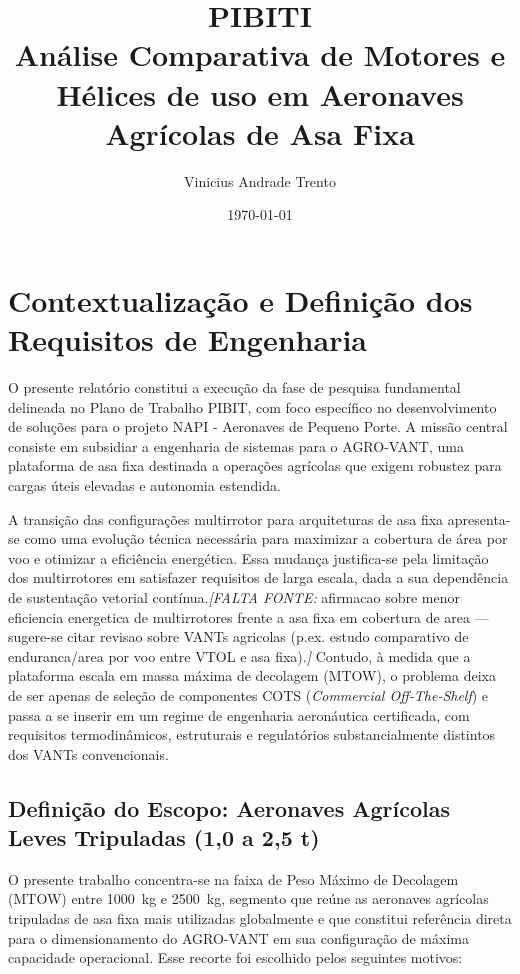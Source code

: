 \documentclass[a4paper,12pt]{article}
\title{\textbf{PIBITI}\\[0.3em]Análise Comparativa de Motores e Hélices de uso em Aeronaves Agrícolas de Asa Fixa}
\author{Vinicius Andrade Trento}
\date{\today}
\newcommand{\citesugerida}[1]{{\color{red}\textit{[FALTA FONTE: }#1\textit{]}}}
\begin{document}
\maketitle
\newpage
\tableofcontents
\newpage


\section{Contextualização e Definição dos Requisitos de Engenharia}

O presente relatório constitui a execução da fase de pesquisa fundamental delineada no Plano de Trabalho PIBIT, com foco específico no desenvolvimento de soluções para o projeto NAPI - Aeronaves de Pequeno Porte. A missão central consiste em subsidiar a engenharia de sistemas para o AGRO-VANT, uma plataforma de asa fixa destinada a operações agrícolas que exigem robustez para cargas úteis elevadas e autonomia estendida.

A transição das configurações multirrotor para arquiteturas de asa fixa apresenta-se como uma evolução técnica necessária para maximizar a cobertura de área por voo e otimizar a eficiência energética. Essa mudança justifica-se pela limitação dos multirrotores em satisfazer requisitos de larga escala, dada a sua dependência de sustentação vetorial contínua.\citesugerida{afirmacao sobre menor eficiencia energetica de multirrotores frente a asa fixa em cobertura de area --- sugere-se citar revisao sobre VANTs agricolas (p.ex. estudo comparativo de enduranca/area por voo entre VTOL e asa fixa).} Contudo, à medida que a plataforma escala em massa máxima de decolagem (MTOW), o problema deixa de ser apenas de seleção de componentes COTS (\textit{Commercial Off-The-Shelf}) e passa a se inserir em um regime de engenharia aeronáutica certificada, com requisitos termodinâmicos, estruturais e regulatórios substancialmente distintos dos VANTs convencionais.

\subsection{Definição do Escopo: Aeronaves Agrícolas Leves Tripuladas (1{,}0 a 2{,}5 t)}

O presente trabalho concentra-se na faixa de Peso Máximo de Decolagem (MTOW) entre \SI{1000}{kg} e \SI{2500}{kg}, segmento que reúne as aeronaves agrícolas tripuladas de asa fixa mais utilizadas globalmente e que constitui referência direta para o dimensionamento do AGRO-VANT em sua configuração de máxima capacidade operacional. Esse recorte foi escolhido pelos seguintes motivos:
\end{document}
